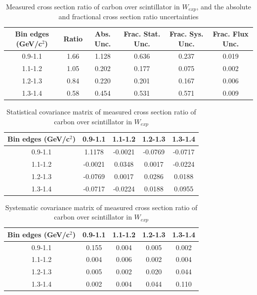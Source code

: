 \documentclass[../main.tex]{subfiles}
\begin{document}
\begin{table}
  \centering
  \renewcommand{\arraystretch}{1.15}
  \caption{Measured cross section ratio of carbon over scintillator in $W_{exp}$, and the absolute and fractional cross section ratio uncertainties}
    \begin{tabular}{c||c|c||c|c|c}
      Bin edges (GeV/c${}^2$) &  Ratio  &  Abs. Unc.  &  Frac. Stat. Unc.  &  Frac. Sys. Unc.  &  Frac. Flux Unc. \\
      \hline
      \hline
      0.9-1.1 & 1.66 & 1.128 & 0.636 & 0.237 & 0.019\\
      1.1-1.2 & 1.05 & 0.202 & 0.177 & 0.075 & 0.002\\
      1.2-1.3 & 0.84 & 0.220 & 0.201 & 0.167 & 0.006\\
      1.3-1.4 & 0.58 & 0.454 & 0.531 & 0.571 & 0.009
    \end{tabular}
  \label{tbl:rationucleonnuc6Wa}
\end{table}
\begin{table}
  \centering
  \renewcommand{\arraystretch}{1.15}
  \caption{Statistical covariance matrix of measured cross section ratio of carbon over scintillator in $W_{exp}$}
    \begin{tabular}{c||cccc}
      Bin edges (GeV/c${}^2$) & 0.9-1.1 & 1.1-1.2 & 1.2-1.3 & 1.3-1.4\\
      \hline
      \hline
      0.9-1.1 & 1.1178 & -0.0021 & -0.0769 & -0.0717\\
      1.1-1.2 & -0.0021 & 0.0348 & 0.0017 & -0.0224\\
      1.2-1.3 & -0.0769 & 0.0017 & 0.0286 & 0.0188\\
      1.3-1.4 & -0.0717 & -0.0224 & 0.0188 & 0.0955
    \end{tabular}
  \label{tbl:rationucleonnuc6Wb}
\end{table}
\begin{table}
  \centering
  \renewcommand{\arraystretch}{1.15}
  \caption{Systematic covariance matrix of measured cross section ratio of carbon over scintillator in $W_{exp}$}
    \begin{tabular}{c||cccc}
      Bin edges (GeV/c${}^2$) & 0.9-1.1 & 1.1-1.2 & 1.2-1.3 & 1.3-1.4\\
      \hline
      \hline
      0.9-1.1 & 0.155 & 0.004 & 0.005 & 0.002\\
      1.1-1.2 & 0.004 & 0.006 & 0.002 & 0.004\\
      1.2-1.3 & 0.005 & 0.002 & 0.020 & 0.044\\
      1.3-1.4 & 0.002 & 0.004 & 0.044 & 0.110
    \end{tabular}
  \label{tbl:rationucleonnuc6Wc}
\end{table}
\end{document}
